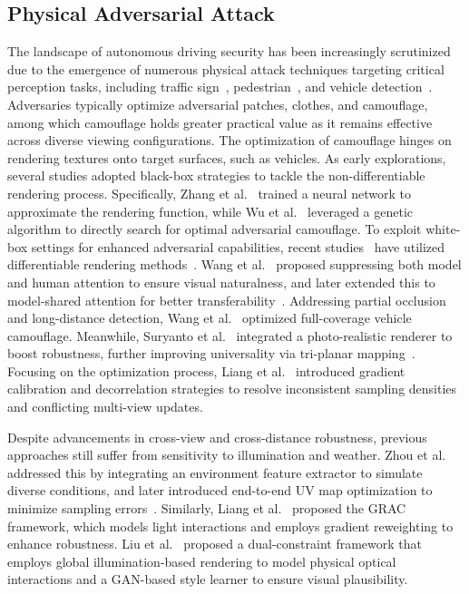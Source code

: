 \documentclass[10pt,journal,compsoc]{IEEEtran}
\begin{document}
\subsection{Physical Adversarial Attack}
The landscape of autonomous driving security has been increasingly scrutinized due to the emergence of numerous physical attack techniques targeting critical perception tasks, including traffic sign~\cite{duan2020naturalstyles, feng2021metaattack, eykholt2018rp2, song2018physical_objectdetection}, pedestrian~\cite{sun2023differential, hu2022adversarial, hu2023physically, huang2020universal, xu2020adversarial, thys2019fooling}, and vehicle detection~\cite{zhang2018camou, wu2020genetic, wang2024TAS, zhang2023boosting, suryanto2022DTA, suryanto2023ACTIVE, wang2021DAS, wang2022FCA, zhu2024multiview, liang2025grac, liang2025gcac, zhou2025raucae2e, wang2025highly, zhang2025phycamo}.
Adversaries typically optimize adversarial patches, clothes, and camouflage, among which camouflage holds greater practical value as it remains effective across diverse viewing configurations.
The optimization of camouflage hinges on rendering textures onto target surfaces, such as vehicles. As early explorations, several studies adopted black-box strategies to tackle the non-differentiable rendering process. 
Specifically, Zhang et al.~\cite{zhang2018camou} trained a neural network to approximate the rendering function, while Wu et al.~\cite{wu2020genetic} leveraged a genetic algorithm to directly search for optimal adversarial camouflage.
To exploit white-box settings for enhanced adversarial capabilities, recent studies~\cite{wang2021DAS, wang2022FCA, suryanto2022DTA, suryanto2023ACTIVE, wang2024TAS} have utilized differentiable rendering methods~\cite{Kato2018NMR, suryanto2022DTA}. 
Wang et al.~\cite{wang2021DAS} proposed suppressing both model and human attention to ensure visual naturalness, and later extended this to model-shared attention for better transferability~\cite{wang2024TAS}. 
Addressing partial occlusion and long-distance detection, Wang et al.~\cite{wang2022FCA} optimized full-coverage vehicle camouflage. 
Meanwhile, Suryanto et al.~\cite{suryanto2022DTA} integrated a photo-realistic renderer to boost robustness, further improving universality via tri-planar mapping~\cite{suryanto2023ACTIVE}.
Focusing on the optimization process, Liang et al.~\cite{liang2025gcac} introduced gradient calibration and decorrelation strategies to resolve inconsistent sampling densities and conflicting multi-view updates.


Despite advancements in cross-view and cross-distance robustness, previous approaches still suffer from sensitivity to illumination and weather.
Zhou et al.~\cite{zhou2024rauca} addressed this by integrating an environment feature extractor to simulate diverse conditions, and later introduced end-to-end UV map optimization to minimize sampling errors~\cite{zhou2025raucae2e}.
Similarly, Liang et al.~\cite{liang2025grac} proposed the GRAC framework, which models light interactions and employs gradient reweighting to enhance robustness.
Liu et al.~\cite{liu2025naturalistic} proposed a dual-constraint framework that employs global illumination-based rendering to model physical optical interactions and a GAN-based style learner to ensure visual plausibility.
\end{document}
